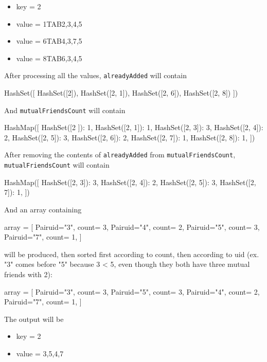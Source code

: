 \documentclass[11pt]{article}
\begin{document}
\begin{justifying}
\begin{itemize}
    \item key \space \space \space = 2
    \item value = 1TAB2,3,4,5
    \item value = 6TAB4,3,7,5
    \item value = 8TAB6,3,4,5
\end{itemize}
After processing all the values, \verb|alreadyAdded| will contain
\begin{python}
HashSet([
    HashSet([2]),
    HashSet([2, 1]),
    HashSet([2, 6]),
    HashSet([2, 8])
])
\end{python}
And \verb|mutualFriendsCount| will contain
\begin{python}
HashMap([
    HashSet([2   ]): 1,
    HashSet([2, 1]): 1,
    HashSet([2, 3]): 3,
    HashSet([2, 4]): 2,
    HashSet([2, 5]): 3,
    HashSet([2, 6]): 2,
    HashSet([2, 7]): 1,
    HashSet([2, 8]): 1,
])
\end{python}
After removing the contents of \verb|alreadyAdded| from \verb|mutualFriendsCount|, \verb|mutualFriendsCount| will contain
\begin{python}
HashMap([
    HashSet([2, 3]): 3,
    HashSet([2, 4]): 2,
    HashSet([2, 5]): 3,
    HashSet([2, 7]): 1,
])
\end{python}
And an array containing
\begin{python}
array = [
    Pair{uid="3", count= 3},
    Pair{uid="4", count= 2},
    Pair{uid="5", count= 3},
    Pair{uid="7", count= 1},
]
\end{python}
will be produced, then sorted first according to count, then according to uid (ex. "3" comes before "5" because 3 < 5, even though they both have three mutual friends with 2):
\begin{python}
array = [
    Pair{uid="3", count= 3},
    Pair{uid="5", count= 3},
    Pair{uid="4", count= 2},
    Pair{uid="7", count= 1},
]
\end{python}
The output will be
\begin{itemize}
    \item key = 2
    \item value = 3,5,4,7
\end{itemize}


\end{justifying}
\end{document}
